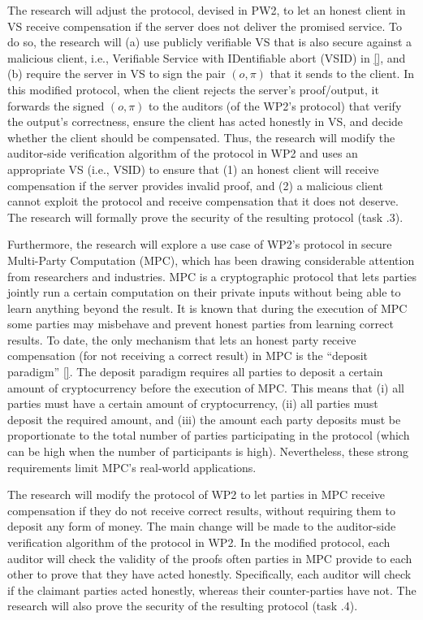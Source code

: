 The research will adjust the protocol, devised in PW2, to let an honest client in VS  receive compensation if the server does not deliver the promised service. To do so, the research will (a) use publicly verifiable VS that is also secure against a malicious client, i.e., Verifiable Service with IDentifiable abort (VSID) in \href{https://arxiv.org/pdf/2208.00283.pdf}{[\printcntr]}, and (b) require the server in VS to sign the pair $(o,\pi)$ that it sends to the client. In this modified protocol, when the client rejects the server's proof/output, it forwards the signed $(o,\pi)$ to the auditors (of the WP2's protocol) that verify the output's correctness, ensure the client has acted honestly in VS, and decide whether the client should be compensated.  Thus, the research will modify the auditor-side verification algorithm of the protocol in WP2 and uses an appropriate VS (i.e., VSID) to ensure that (1) an honest client will receive compensation if the server provides invalid proof, and (2) a malicious client cannot exploit the protocol and receive compensation that it does not deserve. The research will formally prove the security of the resulting protocol (task \4.3). 


 
 Furthermore, the research will explore a use case of WP2's protocol in secure Multi-Party Computation (MPC), which has been drawing considerable attention from researchers and industries. MPC is a cryptographic protocol that lets parties jointly run a certain computation on their private inputs without being able to learn anything beyond the result. It is known that during the execution of MPC some parties may misbehave and prevent honest parties from learning correct results. To date, the only mechanism that lets an honest party receive compensation (for not receiving a correct result) in MPC is the ``deposit paradigm'' \href{https://ieeexplore.ieee.org/stamp/stamp.jsp?tp=&arnumber=6956580}{[\printcntr]}. The deposit paradigm requires all parties to deposit a certain amount of cryptocurrency before the execution of MPC. This means that  (i) all parties must have a certain amount of cryptocurrency, (ii) all parties must deposit the required amount, and (iii) the amount each party deposits must be proportionate to the total number of parties participating in the protocol (which can be high when the number of participants is high). Nevertheless, these strong requirements limit MPC's real-world applications. 
 
The research will modify the protocol of WP2 to let parties in MPC receive compensation if they do not receive correct results,  without requiring them to deposit any form of money. The main change will be made to the auditor-side verification algorithm of the protocol in WP2. In the modified protocol, each auditor will check the validity of the proofs often parties in MPC provide to each other to prove that they have acted honestly. Specifically, each auditor will check if the claimant parties acted honestly, whereas their counter-parties have not. The research will also prove the security of the resulting protocol (task \4.4).
 
